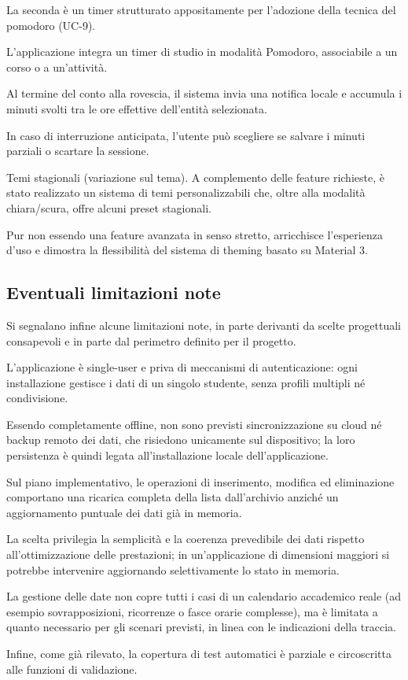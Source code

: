 \documentclass[a4paper, 12pt]{article}
\begin{document}
La seconda è un timer strutturato appositamente per l'adozione della tecnica del pomodoro (UC-9).

L'applicazione integra un timer di studio in modalità Pomodoro, associabile a un corso o a un'attività.

Al termine del conto alla rovescia, il sistema invia una notifica locale e accumula i minuti svolti tra le ore effettive dell'entità selezionata. 

In caso di interruzione anticipata, l'utente può scegliere se salvare i minuti parziali o scartare la sessione.

Temi stagionali (variazione sul tema). A complemento delle feature richieste, è stato realizzato un sistema di temi personalizzabili che, oltre alla modalità chiara/scura, offre alcuni preset stagionali. 

Pur non essendo una feature avanzata in senso stretto, arricchisce l'esperienza d'uso e dimostra la flessibilità del sistema di theming basato su Material 3.

\subsection{Eventuali limitazioni note}
Si segnalano infine alcune limitazioni note, in parte derivanti da scelte progettuali consapevoli e in parte dal perimetro definito per il progetto.

L'applicazione è single-user e priva di meccanismi di autenticazione: ogni installazione gestisce i dati di un singolo studente, senza profili multipli né condivisione.

Essendo completamente offline, non sono previsti sincronizzazione su cloud né backup remoto dei dati, che risiedono unicamente sul dispositivo; la loro persistenza è quindi legata all'installazione locale dell'applicazione.

Sul piano implementativo, le operazioni di inserimento, modifica ed eliminazione comportano una ricarica completa della lista dall'archivio anziché un aggiornamento puntuale dei dati già in memoria.

La scelta privilegia la semplicità e la coerenza prevedibile dei dati rispetto all'ottimizzazione delle prestazioni; in un'applicazione di dimensioni maggiori si potrebbe intervenire aggiornando selettivamente lo stato in memoria.

La gestione delle date non copre tutti i casi di un calendario accademico reale (ad esempio sovrapposizioni, ricorrenze o fasce orarie complesse), ma è limitata a quanto necessario per gli scenari previsti, in linea con le indicazioni della traccia.

Infine, come già rilevato, la copertura di test automatici è parziale e circoscritta alle funzioni di validazione.
\end{document}
